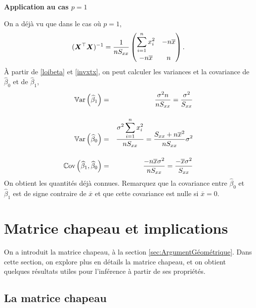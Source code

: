 \begin{exemple}
{\bf{Application au cas $p=1$}}\label{sec:VarCovDesEstimateur}

On a déjà vu que dans le cas où $p=1$,
\begin{equation}
\label{invxtx}
(\bm{X}^\top \bm{X}) ^{-1}
 =
\frac{1}{nS_{xx}}
\begin{pmatrix}
   \displaystyle \sum_{i=1}^n x_i^2 & -n\overline{x}\\[4mm]
-n\overline{x} & n \\
\end{pmatrix}.
\end{equation}
À partir de \eqref{loibeta} et \eqref{invxtx}, on peut calculer les variances et la covariance de $\widehat{\beta}_0$ et de $\widehat{\beta}_1$,
\begin{eqnarray*}
	\mathbb{V}\text{ar}\left(\widehat{\beta}_1\right)&=&\frac{\sigma^2 n}{n S_{xx}} = \frac{\sigma^2}{S_{xx}}\\[4mm]
	\mathbb{V}\text{ar}\left(\widehat{\beta}_0\right)&=&\frac{\displaystyle\sigma^2 \sum_{i=1}^n x_i^2}{n S_{xx}} = \frac{S_{xx} + n\overline{x}^2}{nS_{xx}} \sigma^2\\[4mm]
	\mathbb{C}\text{ov}\left(\widehat{\beta}_1,\widehat{\beta}_0\right)&=& \frac{-n\overline{x} \sigma^2}{n S_{xx}}= \frac{-\overline{x} \sigma^2}{S_{xx}}
\end{eqnarray*}
On obtient les quantités déjà connues. Remarquez que la covariance entre $\widehat{\beta}_0$ et $\widehat{\beta}_1$ est de signe contraire de $\overline{x}$ et que cette covariance est nulle si $\overline{x}=0$.
\end{exemple}




\section{Matrice chapeau et implications}
\label{sec:MatriceChapeau}

On a introduit la matrice chapeau, à la section \ref{sec:ArgumentGéométrique}. Dans cette section, on explore plus en détails la matrice chapeau, et on obtient quelques résultats utiles pour l'inférence à partir de ses propriétés.

\subsection{La matrice chapeau}
\label{sec:LaMatriceChapeau}

